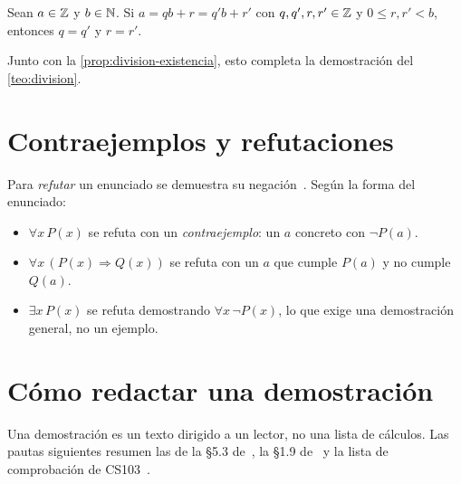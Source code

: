 \begin{proposicion}\label{prop:division-unicidad}
Sean $a\in\mathbb{Z}$ y $b\in\mathbb{N}$. Si $a=qb+r=q'b+r'$ con $q,q',r,r'\in\mathbb{Z}$ y $0\le r,r'<b$, entonces $q=q'$ y $r=r'$.
\end{proposicion}

Junto con la \cref{prop:division-existencia}, esto completa la demostración del \cref{teo:division}.

\addtocounter{definicion}{1}%

\section{Contraejemplos y refutaciones}

Para \emph{refutar} un enunciado se demuestra su negación~\cite[cap.~9]{hammack}. Según la forma del enunciado:
\begin{itemize}[leftmargin=1.4em]
  \item $\forall x\,P(x)$ se refuta con un \emph{contraejemplo}: un $a$ concreto con $\neg P(a)$.
  \item $\forall x\,(P(x)\Rightarrow Q(x))$ se refuta con un $a$ que cumple $P(a)$ y no cumple $Q(a)$.
  \item $\exists x\,P(x)$ se refuta demostrando $\forall x\,\neg P(x)$, lo que exige una demostración general, no un ejemplo.
\end{itemize}

\addtocounter{definicion}{1}%

\addtocounter{definicion}{1}%

\section{Cómo redactar una demostración}

Una demostración es un texto dirigido a un lector, no una lista de cálculos. Las pautas siguientes resumen las de la §5.3 de~\cite{hammack}, la §1.9 de~\cite{mcs} y la lista de comprobación de CS103~\cite{cs103}.

